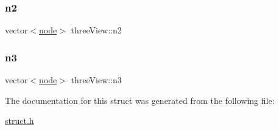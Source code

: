 \mbox{\label{structthreeView_a7e6db3d7b3235d0cf51c67698ac8bd9b}} 
\subsubsection{\texorpdfstring{n2}{n2}}
{\footnotesize\ttfamily vector$<$\hyperlink{structnode}{node}$>$ three\+View\+::n2}

\mbox{\label{structthreeView_a3e1841e1dbd42d7b216166a3637be52d}} 
\subsubsection{\texorpdfstring{n3}{n3}}
{\footnotesize\ttfamily vector$<$\hyperlink{structnode}{node}$>$ three\+View\+::n3}



The documentation for this struct was generated from the following file\+:\begin{DoxyCompactItemize}
\item 
\hyperlink{struct_8h}{struct.\+h}\end{DoxyCompactItemize}
